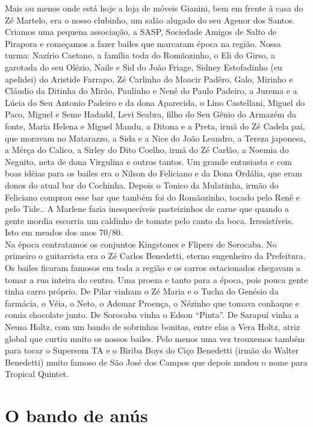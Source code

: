 \documentclass[12pt,brazil,]{book}
\begin{document}
Mais ou menos onde está hoje a loja de móveis Gianini, bem em frente à
casa do Zé Martelo, era o nosso clubinho, um salão alugado do seu Agenor
dos Santos. Criamos uma pequena associação, a SASP, Sociedade Amigos de
Salto de Pirapora e começamos a fazer bailes que marcaram época na
região. Nossa turma: Nazírio Caetano, a família toda do Romãozinho, o
Eli do Girso, a garotada do seu Olézio, Naile e Sid do João Friage,
Sidney Estofadinho (eu apelidei) do Aristide Farrapo, Zé Carlinho do
Moacir Padêro, Galo, Mirinho e Cláudio da Ditinha do Mirão, Paulinho e
Nenê do Paulo Padeiro, a Jurema e a Lúcia do Seu Antonio Padeiro e da
dona Aparecida, o Lino Castellani, Miguel do Paco, Miguel e Seme Hadadd,
Levi Seabra, filho do Seu Gênio do Armazém da fonte, Maria Helena e
Miguel Mandu, a Ditona e a Preta, irmã do Zé Cadela pai, que moravam no
Matarazzo, a Sida e a Nice do João Leandro, a Tereza japonesa, a Mérça
do Calico, a Sirley do Dito Coelho, irmã do Zé Carlão, a Noemia do
Neguito, neta de dona Virgulina e outros tantos. Um grande entusiasta e
com boas idéias para os bailes era o Nilson do Feliciano e da Dona
Ordália, que eram donos do atual bar do Cochinha. Depois o Tonico da
Mulatinha, irmão do Feliciano comprou esse bar que também foi do
Romãozinho, tocado pelo Renê e pelo Tide.. A Marlene fazia inesquecíveis
pasteizinhos de carne que quando a gente mordia escorria um caldinho de
tomate pelo canto da boca. Irresistíveis. Isto em meados dos anos
70/80.\\
Na época contratamos os conjuntos Kingstones e Flipers de Sorocaba. No
primeiro o guitarrista era o Zé Carlos Benedetti, eterno engenheiro da
Prefeitura. Os bailes ficaram famosos em toda a região e os carros
estacionados chegavam a tomar a rua inteira do centro. Uma proeza e
tanto para a época, pois pouca gente tinha carro próprio. De Pilar
vinham o Zé Maria e o Tucha do Genésio da farmácia, o Véia, o Neto, o
Ademar Proença, o Nézinho que tomava conhaque e comia chocolate junto.
De Sorocaba vinha o Edson ``Pinta''. De Sarapuí vinha a Neusa Holtz, com
um bando de sobrinhas bonitas, entre elas a Vera Holtz, atriz global que
curtiu muito os nossos bailes. Pelo menos uma vez trouxemos também para
tocar o Supersom TA e o Biriba Boys do Ciço Benedetti (irmão do Walter
Benedetti) muito famoso de São José dos Campos que depois mudou o nome
para Tropical Quintet.

\section{O bando de anús}\label{o-bando-de-anuxfas}
\end{document}
